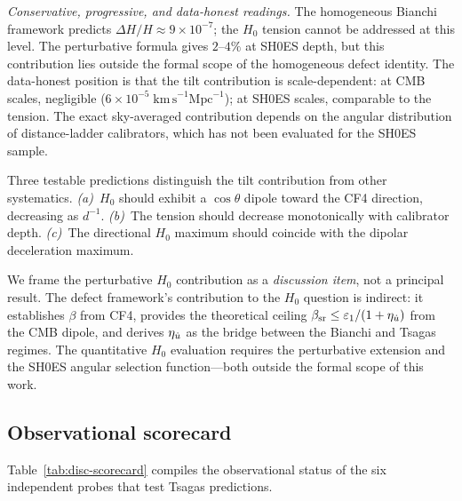 \emph{Conservative, progressive, and data-honest readings.}
The homogeneous Bianchi framework predicts
$\Delta H/H \approx 9 \times 10^{-7}$; the $H_0$ tension cannot
be addressed at this level.  The perturbative formula gives
$2$--$4\%$ at SH0ES depth, but this contribution lies outside the
formal scope of the homogeneous defect identity.  The data-honest
position is that the tilt contribution is scale-dependent: at
CMB scales, negligible ($6 \times 10^{-5}\;\mathrm{km\,s}^{-1}
\mathrm{Mpc}^{-1}$); at SH0ES scales, comparable to the tension.
The exact sky-averaged contribution depends on the angular
distribution of distance-ladder calibrators, which has not been
evaluated for the SH0ES sample.

Three testable predictions distinguish the tilt contribution from
other systematics.
\emph{(a)}~$H_0$ should exhibit a $\cos\theta$ dipole toward
the CF4 direction, decreasing as $d^{-1}$.
\emph{(b)}~The tension should decrease monotonically with
calibrator depth.
\emph{(c)}~The directional $H_0$ maximum should coincide with
the dipolar deceleration maximum.

We frame the perturbative $H_0$ contribution as a
\emph{discussion item}, not a principal result.  The defect
framework's contribution to the $H_0$ question is indirect:
it establishes $\beta$ from CF4, provides the theoretical ceiling
$\beta_{\mathrm{sr}} \leq \varepsilon_1/(1+\eta_{\dot{u}})$ from the CMB dipole, and
derives $\eta_{\dot{u}}$ as the bridge between the Bianchi and Tsagas
regimes.  The quantitative $H_0$ evaluation requires the
perturbative extension and the SH0ES angular selection
function---both outside the formal scope of this work.





\subsection{Observational scorecard}
\label{sec:disc-scorecard}

Table~\ref{tab:disc-scorecard} compiles the observational
status of the six independent probes that test Tsagas predictions.


